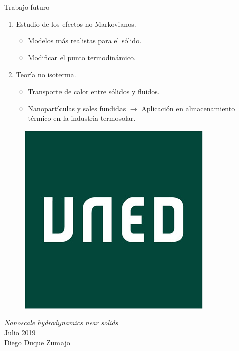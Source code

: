 \documentclass{beamer}
\begin{document}
\begin{frame}{Trabajo futuro}
  \begin{enumerate}
        \item Estudio de los efectos no Markovianos.
      \begin{itemize}
        \item Modelos más realistas para el sólido. 
        \item Modificar el punto termodinámico.  
      \end{itemize}
    \item Teoría no isoterma. 
      \begin{itemize}
    \item Transporte de calor entre sólidos y fluidos.
    \item Nanopartículas y sales fundidas $\rightarrow$ Aplicación en almacenamiento térmico en la industria termosolar.
      \end{itemize}
  \end{enumerate}
\end{frame}

\begin{frame}
\begin{figure}
\includegraphics[width=0.2\linewidth]{logo}
\end{figure}
  \vspace{0.5cm}  
\begin{center}
\textit{Nanoscale hydrodynamics near solids}\\
Julio 2019\\
Diego Duque Zumajo
\end{center}

\end{frame}
\end{document}
